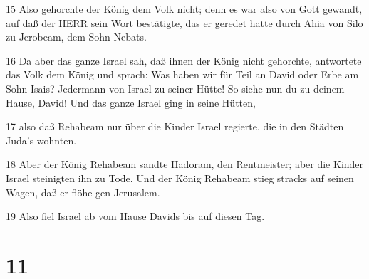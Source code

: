 \par 15 Also gehorchte der König dem Volk nicht; denn es war also von Gott gewandt, auf daß der HERR sein Wort bestätigte, das er geredet hatte durch Ahia von Silo zu Jerobeam, dem Sohn Nebats.
\par 16 Da aber das ganze Israel sah, daß ihnen der König nicht gehorchte, antwortete das Volk dem König und sprach: Was haben wir für Teil an David oder Erbe am Sohn Isais? Jedermann von Israel zu seiner Hütte! So siehe nun du zu deinem Hause, David! Und das ganze Israel ging in seine Hütten,
\par 17 also daß Rehabeam nur über die Kinder Israel regierte, die in den Städten Juda's wohnten.
\par 18 Aber der König Rehabeam sandte Hadoram, den Rentmeister; aber die Kinder Israel steinigten ihn zu Tode. Und der König Rehabeam stieg stracks auf seinen Wagen, daß er flöhe gen Jerusalem.
\par 19 Also fiel Israel ab vom Hause Davids bis auf diesen Tag.

\chapter{11}

